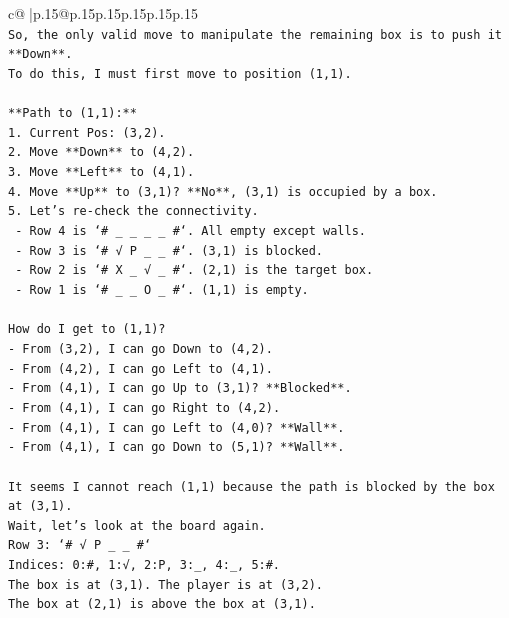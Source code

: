 \documentclass{article}
\begin{document}
{\begin{supertabular}{c@{$\;$}|p{.15\linewidth}@{}p{.15\linewidth}p{.15\linewidth}p{.15\linewidth}p{.15\linewidth}p{.15\linewidth}}
{{{\\ 
\texttt{So, the only valid move to manipulate the remaining box is to push it **Down**.} \\
\texttt{To do this, I must first move to position (1,1).} \\
\\ 
\texttt{**Path to (1,1):**} \\
\texttt{1.  Current Pos: (3,2).} \\
\texttt{2.  Move **Down** to (4,2).} \\
\texttt{3.  Move **Left** to (4,1).} \\
\texttt{4.  Move **Up** to (3,1)? **No**, (3,1) is occupied by a box.} \\
\texttt{5.  Let's re{-}check the connectivity.} \\
\texttt{    {-} Row 4 is `\# \_ \_ \_ \_ \#`. All empty except walls.} \\
\texttt{    {-} Row 3 is `\# √ P \_ \_ \#`. (3,1) is blocked.} \\
\texttt{    {-} Row 2 is `\# X \_ √ \_ \#`. (2,1) is the target box.} \\
\texttt{    {-} Row 1 is `\# \_ \_ O \_ \#`. (1,1) is empty.} \\
\\ 
\texttt{How do I get to (1,1)?} \\
\texttt{{-} From (3,2), I can go Down to (4,2).} \\
\texttt{{-} From (4,2), I can go Left to (4,1).} \\
\texttt{{-} From (4,1), I can go Up to (3,1)? **Blocked**.} \\
\texttt{{-} From (4,1), I can go Right to (4,2).} \\
\texttt{{-} From (4,1), I can go Left to (4,0)? **Wall**.} \\
\texttt{{-} From (4,1), I can go Down to (5,1)? **Wall**.} \\
\\ 
\texttt{It seems I cannot reach (1,1) because the path is blocked by the box at (3,1).} \\
\texttt{Wait, let's look at the board again.} \\
\texttt{Row 3: `\# √ P \_ \_ \#`} \\
\texttt{Indices: 0:\#, 1:√, 2:P, 3:\_, 4:\_, 5:\#.} \\
\texttt{The box is at (3,1). The player is at (3,2).} \\
\texttt{The box at (2,1) is above the box at (3,1).} \\
}}}
\end{supertabular}}
\end{document}
